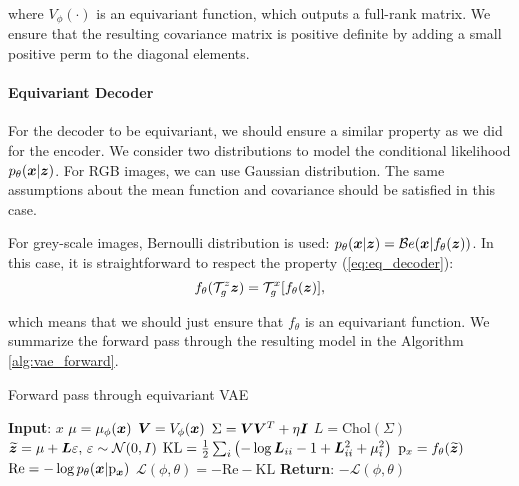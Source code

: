 where $V_{\phi}(\cdot)$ is an equivariant function, which outputs a full-rank matrix.  We ensure that the resulting covariance matrix is positive definite by adding a small positive perm to the diagonal elements.

\paragraph{Equivariant Decoder}
For the decoder to be equivariant, we should ensure a similar property as we did for the encoder. We consider two distributions to model the conditional likelihood $p_{\theta}({\bm{x}}|{\bm{z}})$. For RGB images, we can use Gaussian distribution. The same assumptions about the mean function and covariance should be satisfied in this case. 

For grey-scale images, Bernoulli distribution is used: $p_{\theta}({\bm{x}}|{\bm{z}}) = \mathcal{B}e({\bm{x}} | f_{\theta}({\bm{z}}))$. In this case, it is straightforward to respect the property (\ref{eq:eq_decoder}): 
\begin{equation}
f_{\theta}({\mathcal{T}}_g^z {\bm{z}})  = \mathcal{T}_g^x[f_{\theta}({\bm{z}})],
\end{equation}

which means that we should just ensure that $f_{\theta}$ is an equivariant function. We summarize the forward pass through the resulting model in the Algorithm \ref{alg:vae_forward}.

\begin{algorithm}[t]
	\caption{Forward pass through equivariant VAE}
	\label{alg:vae_forward}
	\begin{algorithmic}
	    \State \hskip-3mm \textbf{Input}: $x$
	    \State $\mu = \mu_{\phi}({\bm{x}})$  
	    \State ${\bm{V}} = V_{\phi}({\bm{x}})$
		\State $\Sigma = {\bm{V}}{\bm{V}}^T + \eta {\bm{I}}$
		\State $L = \text{Chol}(\Sigma)$ 
		\State $\widetilde{{\bm{z}}} = \mu + {\bm{L}} \varepsilon, \, \varepsilon \sim \mathcal{N}(0, I)$
		\State $\text{KL} = \tfrac12\sum_i\left(-\log {\bm{L}}_{ii} - 1 + {\bm{L}}_{ii}^2 + \mu_i^2 \right)$
		\State $\mathrm{p}_x = f_{\theta}(\widetilde{{\bm{z}}})$ 
		\State $\text{Re} = -\log p_{\theta}({\bm{x}}| \mathrm{p}_{\bm{x}})$ 
		\State $\mathcal{L}(\phi, \theta) =  - \text{Re} - \text{KL}$ 
		\State  \hskip-3mm \textbf{Return}: $ - \mathcal{L}(\phi, \theta)$
	\end{algorithmic}
\end{algorithm}

